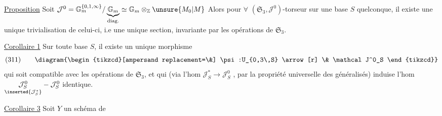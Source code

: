 


\uline{Proposition} Soit 
$\mathcal J^0=\mathbb G_m^{\{0,1,\infty\}}/\underbrace{\mathbb G_m}_{\mathrm{diag.}}\simeq\mathbb G_m\otimes_{\mathbb Z}\unsure{M_0|M}$
Alors pour $\forall$ $(\mathfrak S_3,\mathcal J^0)$-torseur sur une base $S$ quelconque, il existe une unique trivialisation de celui-ci, i.e une unique section, invariante par les opérations de $\mathfrak S_3$.

\uline{Corollaire 1} Sur toute base $S$, il existe un unique morphisme
\[
(311)\qquad
\diagram{\begin{tikzcd}[ampersand replacement=\&]
\psi:U_{0,3\,S} \arrow[r] \& \mathcal J^0_S
\end{tikzcd}}
\]
qui soit compatible avec les opérations de $\mathfrak S_3$, et qui (via l'hom
$\mathcal J^*_S\longrightarrow\mathcal J^0_S$   , par la propriété universelle des   généralisés) induise l'hom
$\underset{\inserted{\mathcal J^*_S}}{\mathcal J^0_S}-\mathcal J^0_S$ identique.


\uline{Corollaire 3} Soit $Y$ un schéma de




